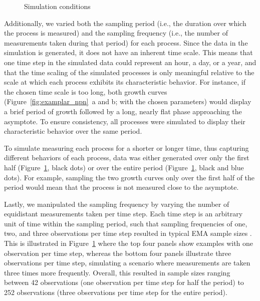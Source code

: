 \documentclass[man, floatsintext]{apa7}
\begin{document}
\begin{figure}[!t]
  \caption{Simulation conditions}
  \label{fig:exemplar_pn}
\end{figure}

Additionally, we varied both the sampling period (i.e., the duration over which
the process is measured) and the sampling frequency (i.e., the number of
measurements taken during that period) for each process. Since the data in the
simulation is generated, it does not have an inherent time scale. This means
that one time step in the simulated data could represent an hour, a day, or a
year, and that the time scaling of the simulated processes is only meaningful
relative to the scale at which each process exhibits its characteristic
behavior. For instance, if the chosen time scale is too long, both growth
curves (Figure~\ref{fig:examplar_npn}~a and b; with the chosen parameters)
would display a brief period of growth followed by a long, nearly flat phase
approaching the asymptote. To ensure consistency, all processes were simulated
to display their characteristic behavior over the same period.

To simulate measuring each process for a shorter or longer time, thus capturing
different behaviors of each process, data was either generated over only the
first half (Figure~\ref{fig:exemplar_pn}, black dots) or over the entire period
(Figure~\ref{fig:exemplar_pn}, black and blue dots). For example, sampling the
two growth curves only over the first half of the period would mean that the
process is not measured close to the asymptote.

Lastly, we manipulated the sampling frequency by varying the number of
equidistant measurements taken per time step. Each time step is an arbitrary
unit of time within the sampling period, such that sampling frequencies of one,
two, and three observations per time step resulted in typical EMA sample sizes
\parencite{wrzus_ecological_2023}. This is illustrated in
Figure~\ref{fig:exemplar_pn} where the top four panels show examples with one
observation per time step, whereas the bottom four panels illustrate three
observations per time step, simulating a scenario where measurements are taken
three times more frequently. Overall, this resulted in sample sizes ranging
between 42 observations (one observation per time step for half the period) to
252 observations (three observations per time step for the entire period).
\end{document}
